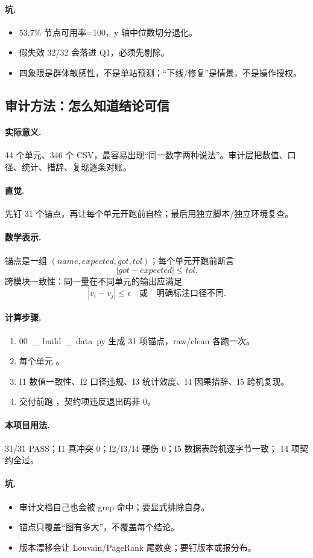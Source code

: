 \paragraph{坑.}
\begin{itemize}
  \item 53.7\% 节点可用率=100，y 轴中位数切分退化。
  \item 假失效 32/32 会落进 Q1，必须先剔除。
  \item 四象限是群体敏感性，不是单站预测；“下线/修复”是情景，不是操作授权。
\end{itemize}

\subsection{审计方法：怎么知道结论可信}

\paragraph{实际意义.}
44 个单元、346 个 CSV，最容易出现“同一数字两种说法”。审计层把数值、口径、统计、措辞、复现逐条对账。

\paragraph{直觉.}
先钉 31 个锚点，再让每个单元开跑前自检；最后用独立脚本/独立环境复查。

\paragraph{数学表示.}
锚点是一组 \((name, expected, got, tol)\)；每个单元开跑前断言
\[
|got-expected|\le tol.
\]
跨模块一致性：同一量在不同单元的输出应满足
\[
|v_i-v_j|\le \epsilon \quad\text{或}\quad \text{明确标注口径不同}.
\]

\paragraph{计算步骤.}
\begin{enumerate}
  \item \unit{00\_build\_data.py} 生成 31 项锚点，raw/clean 各跑一次。
  \item 每个单元 。
  \item I1 数值一致性、I2 口径违规、I3 统计效度、I4 因果措辞、I5 跨机复现。
  \item 交付前跑 ，契约项违反退出码非 0。
\end{enumerate}

\paragraph{本项目用法.}
31/31 PASS；I1 真冲突 0；I2/I3/I4 硬伤 0；I5 数据表跨机逐字节一致； 14 项契约全过。

\paragraph{坑.}
\begin{itemize}
  \item 审计文档自己也会被 grep 命中；要显式排除自身。
  \item 锚点只覆盖“图有多大”，不覆盖每个结论。
  \item 版本漂移会让 Louvain/PageRank 尾数变；要钉版本或报分布。
\end{itemize}
